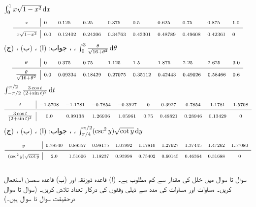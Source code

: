 $\int_0^1 x\sqrt{1-x^2}\dif x$
\begin{align*}
\begin{array}{>{\scriptstyle}c|*9{>{\scriptstyle}l}}
x&0&0.125&0.25&0.375&0.5&0.625&0.75&0.875&1.0\\
\midrule
x\sqrt{1-x^2}&0.0&0.12402&0.24206&0.34763&0.43301&0.48789&0.49608&0.42361&0
\end{array}
\end{align*}
جواب:\quad
(ا) ، (ب) ، (ج) ، ، 
$\int_0^3 \tfrac{\theta}{\sqrt{16+\theta^2}}\dif \theta$
\begin{align*}
\begin{array}{>{\scriptstyle}c|*9{>{\scriptstyle}l}}
\theta&0&0.375&0.75&1.125&1.5&1.875&2.25&2.625&3.0\\
\midrule
\tfrac{\theta}{\sqrt{16+\theta^2}}&0.0&0.09334&0.18429&0.27075&0.35112&0.42443&0.49026&0.58466&0.6
\end{array}
\end{align*}
$\int_{-\pi/2}^{\pi/2} \tfrac{3\cos t}{(2+\sin t)^2}\dif t$
\begin{align*}
\begin{array}{>{\scriptstyle}c|*9{>{\scriptstyle}c}}
t&-1.5708&-1.1781&-0.7854&-0.3927&0&0.3927&0.7854&1.1781&1.5708\\
\midrule
\tfrac{3\cos t}{(2+\sin t)^2}&0.0&0.99138&1.26906&1.05961&0.75&0.48821&0.28946&0.13429&0
\end{array}
\end{align*}
جواب:\quad
(ا) ، (ب) ، (ج) ، ، 
$\int_{\pi/4}^{\pi/2} (\csc^2y)\sqrt{\cot y}\dif y$
\begin{align*}
\begin{array}{>{\scriptstyle}c|*9{>{\scriptstyle}c}}
y&0.78540&0.88357&0.98175&1.07992&1.17810&1.27627&1.37445&1.47262&1.57080\\
\midrule
(\csc^2y)\sqrt{\cot y}&2.0&1.51606&1.18237&0.93998&0.75402&0.60145&0.46364&0.31688&0
\end{array}
\end{align*}
\\
سوال  تا سوال  میں خلل کی مقدار  سے کم مطلوب ہے۔ (ا) قاعدہ ذوزنقہ اور (ب) قاعدہ سمسن استعمال کریں۔  مساوات  اور مساوات  کی مدد سے ذیلی وقفوں کی درکار تعداد تلاش کریں۔ (سوال  تا سوال  درحقیقت سوال  تا سوال  ہیں۔) 

